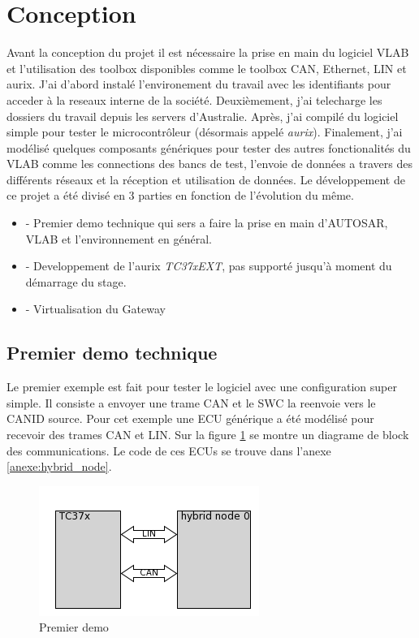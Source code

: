 \section{Conception}

Avant la conception du projet il est nécessaire la prise en main du logiciel VLAB et l'utilisation des toolbox disponibles comme le toolbox CAN, Ethernet, LIN et aurix. J'ai d'abord instal\'e l'environement du travail avec les identifiants pour acceder \`a la reseaux interne de la soci\'et\'e. Deuxièmement, j'ai telecharge les dossiers du travail depuis les servers d'Australie. Apr\`es, j'ai compil\'e du logiciel simple pour tester le microcontr\^oleur (désormais appel\'e \textit{aurix}). Finalement, j'ai mod\'elis\'e quelques composants génériques pour tester des autres fonctionalit\'es du VLAB comme les connections des bancs de test, l'envoie de donn\'ees a travers des différents réseaux et la réception et utilisation de donn\'ees. Le développement de ce projet a \'et\'e divis\'e en 3 parties en fonction de l'évolution du même.

\begin{itemize}
    \item - Premier demo technique qui sers a faire la prise en main d'AUTOSAR, VLAB et l'environnement en général.
    \item - Developpement de l'aurix \textit{TC37xEXT}\cite{aurix.tc37e}, pas support\'e jusqu'\`a moment du démarrage du stage.
    \item - Virtualisation du Gateway
\end{itemize}

\subsection{Premier demo technique}

Le premier exemple est fait pour tester le logiciel avec une configuration super simple. Il consiste a envoyer une trame CAN et le SWC la reenvoie vers le CANID source. Pour cet exemple une ECU générique a \'et\'e modélisé pour recevoir des trames CAN et LIN. Sur la figure \ref{fig:first-demo-diagram} se montre un diagrame de block des communications. Le code de ces ECUs se trouve dans l'anexe \ref{anexe:hybrid_node}.

\begin{figure}[!htb]
 \centering
 \includegraphics[]{img/first_demo_testbench.png}
 \caption{Premier demo}
 \label{fig:first-demo-diagram}
\end{figure}


